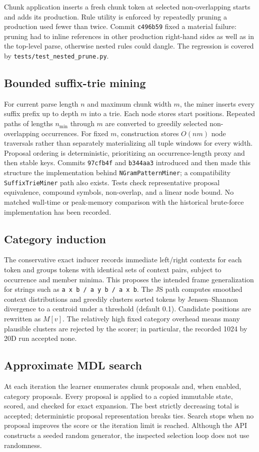 \documentclass[11pt]{article}
\begin{document}
Chunk application inserts a fresh chunk token at selected non-overlapping starts and adds its production. Rule utility is enforced by repeatedly pruning a production used fewer than twice. Commit \texttt{c496b59} fixed a material failure: pruning had to inline references in other production right-hand sides as well as in the top-level parse, otherwise nested rules could dangle. The regression is covered by \texttt{tests/test\_nested\_prune.py}.

\subsection{Bounded suffix-trie mining}
For current parse length $n$ and maximum chunk width $m$, the miner inserts every suffix prefix up to depth $m$ into a trie. Each node stores start positions. Repeated paths of lengths $n_{\min}$ through $m$ are converted to greedily selected non-overlapping occurrences. For fixed $m$, construction stores $O(nm)$ node traversals rather than separately materializing all tuple windows for every width. Proposal ordering is deterministic, prioritizing an occurrence-length proxy and then stable keys. Commits \texttt{97cfb4f} and \texttt{b344aa3} introduced and then made this structure the implementation behind \texttt{NGramPatternMiner}; a compatibility \texttt{SuffixTrieMiner} path also exists. Tests check representative proposal equivalence, compound symbols, non-overlap, and a linear node bound. No matched wall-time or peak-memory comparison with the historical brute-force implementation has been recorded.

\subsection{Category induction}
The conservative exact inducer records immediate left/right contexts for each token and groups tokens with identical sets of context pairs, subject to occurrence and member minima. This proposes the intended frame generalization for strings such as \texttt{a x b / a y b / a x b}. The JS path computes smoothed context distributions and greedily clusters sorted tokens by Jensen--Shannon divergence to a centroid under a threshold (default 0.1). Candidate positions are rewritten as $M[v]$. The relatively high fixed category overhead means many plausible clusters are rejected by the scorer; in particular, the recorded 1024 by 20D run accepted none.

\subsection{Approximate MDL search}
At each iteration the learner enumerates chunk proposals and, when enabled, category proposals. Every proposal is applied to a copied immutable state, scored, and checked for exact expansion. The best strictly decreasing total is accepted; deterministic proposal representation breaks ties. Search stops when no proposal improves the score or the iteration limit is reached. Although the API constructs a seeded random generator, the inspected selection loop does not use randomness.
\end{document}
